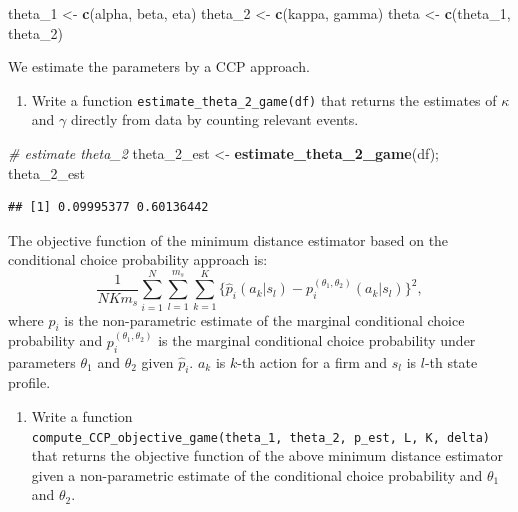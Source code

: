 \documentclass[]{book}
\newenvironment{Shaded}{\begin{snugshade}}{\end{snugshade}}
\newcommand{\KeywordTok}[1]{\textcolor[rgb]{0.13,0.29,0.53}{\textbf{#1}}}
\newcommand{\DecValTok}[1]{\textcolor[rgb]{0.00,0.00,0.81}{#1}}
\newcommand{\StringTok}[1]{\textcolor[rgb]{0.31,0.60,0.02}{#1}}
\newcommand{\CommentTok}[1]{\textcolor[rgb]{0.56,0.35,0.01}{\textit{#1}}}
\newcommand{\NormalTok}[1]{#1}
\providecommand{\tightlist}{%
  \setlength{\itemsep}{0pt}\setlength{\parskip}{0pt}}
\begin{document}
\begin{Shaded}
\begin{Highlighting}[]
\NormalTok{theta_}\DecValTok{1}\NormalTok{ <-}\StringTok{ }\KeywordTok{c}\NormalTok{(alpha, beta, eta)}
\NormalTok{theta_}\DecValTok{2}\NormalTok{ <-}\StringTok{ }\KeywordTok{c}\NormalTok{(kappa, gamma)}
\NormalTok{theta <-}\StringTok{ }\KeywordTok{c}\NormalTok{(theta_}\DecValTok{1}\NormalTok{, theta_}\DecValTok{2}\NormalTok{)}
\end{Highlighting}
\end{Shaded}

We estimate the parameters by a CCP approach.

\begin{enumerate}
\def\labelenumi{\arabic{enumi}.}
\tightlist
\item
  Write a function \texttt{estimate\_theta\_2\_game(df)} that returns
  the estimates of \(\kappa\) and \(\gamma\) directly from data by
  counting relevant events.
\end{enumerate}

\begin{Shaded}
\begin{Highlighting}[]
\CommentTok{# estimate theta_2}
\NormalTok{theta_2_est <-}\StringTok{ }\KeywordTok{estimate_theta_2_game}\NormalTok{(df); theta_2_est}
\end{Highlighting}
\end{Shaded}

\begin{verbatim}
## [1] 0.09995377 0.60136442
\end{verbatim}

The objective function of the minimum distance estimator based on the
conditional choice probability approach is: \[
\frac{1}{N K m_s} \sum_{i = 1}^N \sum_{l = 1}^{m_s} \sum_{k = 1}^{K}\{\hat{p}_i(a_k|s_l) - p_i^{(\theta_1, \theta_2)}(a_k|s_l)\}^2,
\] where \(\hat{p}_i\) is the non-parametric estimate of the marginal
conditional choice probability and \(p_i^{(\theta_1, \theta_2)}\) is the
marginal conditional choice probability under parameters \(\theta_1\)
and \(\theta_2\) given \(\hat{p}_i\). \(a_k\) is \(k\)-th action for a
firm and \(s_l\) is \(l\)-th state profile.

\begin{enumerate}
\def\labelenumi{\arabic{enumi}.}
\setcounter{enumi}{1}
\tightlist
\item
  Write a function
  \texttt{compute\_CCP\_objective\_game(theta\_1,\ theta\_2,\ p\_est,\ L,\ K,\ delta)}
  that returns the objective function of the above minimum distance
  estimator given a non-parametric estimate of the conditional choice
  probability and \(\theta_1\) and \(\theta_2\).
\end{enumerate}
\end{document}
